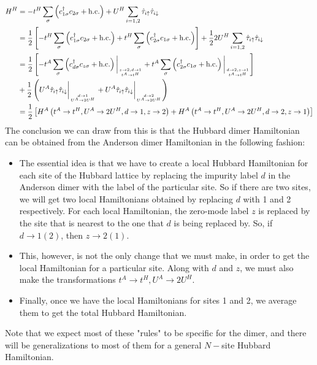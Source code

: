 \documentclass[10pt]{report}
\numberwithin{equation}{section}
\begin{document}
\begin{equation}\begin{aligned}
	H^H &= -t^H\sum_{\sigma}\left(c^\dagger_{1\sigma}c_{2\sigma} + \text{h.c.}\right) + U^H\sum_{i=1,2}\hat \tau_{i \uparrow}\hat \tau_{i \downarrow}\\
	    &= \frac{1}{2}\left[-t^H\sum_{\sigma}\left(c^\dagger_{1\sigma}c_{2\sigma} + \text{h.c.}\right) + t^H\sum_{\sigma}\left(c^\dagger_{2\sigma}c_{1\sigma} + \text{h.c.}\right)\right] + \frac{1}{2} 2U^H\sum_{i=1,2}\hat \tau_{i \uparrow}\hat \tau_{i \downarrow}\\
	    &= \frac{1}{2}\left[-t^A\sum_{\sigma}\left(c^\dagger_{d\sigma}c_{z\sigma} + \text{h.c.}\right)\bigg\vert_{z \to 2, d \to 1\atop{t^A \to t^H}} + t^A\sum_{\sigma}\left(c^\dagger_{2\sigma}c_{1\sigma} + \text{h.c.}\right)\bigg\vert_{d \to 2,z \to 1\atop{t^A \to t^H}} \right] \\
	    &+ \frac{1}{2} \left(U^A\hat \tau_{i \uparrow}\hat \tau_{i \downarrow}\bigg\vert_{d \to 1\atop{U^A \to 2U^H}} + U^A\hat \tau_{i \uparrow}\hat \tau_{i \downarrow}\bigg\vert_{d \to 2\atop{U^A \to 2U^H}}\right)\\
	    &=\frac{1}{2}\left[H^A\left(t^A \to t^H, U^A \to 2U^H, d \to 1, z \to 2\right) + H^A\left(t^A \to t^H, U^A \to 2U^H, d \to 2, z \to 1\right)\right]
\end{aligned}\end{equation}
The conclusion we can draw from this is that the Hubbard dimer Hamiltonian can be obtained from the Anderson dimer Hamiltonian in the following fashion:
\begin{itemize}
	\item The essential idea is that we have to create a local Hubbard Hamiltonian for each site of the Hubbard lattice by replacing the impurity label \(d\) in the Anderson dimer with the label of the particular site. So if there are two sites, we will get two local Hamiltonians obtained by replacing \(d\) with 1 and 2 respectively. For each local Hamiltonian, the zero-mode label \(z\) is replaced by the site that is nearest to the one that \(d\) is being replaced by. So, if \(d \to 1(2)\), then \(z \to 2(1)\).
	\item This, however, is not the only change that we must make, in order to get the local Hamiltonian for a particular site. Along with \(d\) and \(z\), we must also make the transformations \(t^A \to t^H, U^A \to 2U^H\).
	\item Finally, once we have the local Hamiltonians for sites 1 and 2, we average them to get the total Hubbard Hamiltonian.
\end{itemize}
Note that we expect most of these "rules" to be specific for the dimer, and there will be generalizations to most of them for a general \(N-\)site Hubbard Hamiltonian.
\end{document}
